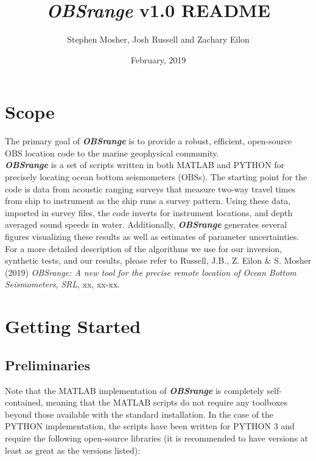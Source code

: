 \documentclass[titlepage, 12pt]{article}
\begin{document}
 \title{\textbf{\textit{\textit{\textbf{OBSrange}}}} v1.0 README}
 \author{Stephen Mosher, Josh Russell and Zachary Eilon}
 \date{February, 2019}
 \maketitle{}

 \tableofcontents
 \newpage

 \section{Scope}
   The primary goal of \textit{\textbf{OBSrange}} is to provide a robust, efficient, open-source OBS location code to the marine geophysical community.\\ 

   \textit{\textbf{OBSrange}} is a set of scripts written in both MATLAB and PYTHON for precisely locating ocean bottom seismometers (OBSs). The starting point for the code is data from acoustic ranging surveys that measure two-way travel times from ship to instrument as the ship runs a survey pattern. Using these data, imported in survey files, the code inverts for instrument locations, and depth averaged sound speeds in water. Additionally, \textit{\textbf{OBSrange}} generates several figures visualizing these results as well as estimates of parameter uncertainties. For a more detailed description of the algorithms we use for our inversion, synthetic tests, and our results, please refer to Russell, J.B., Z. Eilon \& S. Mosher (2019) \textit{OBSrange: A new tool for the precise remote location of Ocean Bottom Seismometers}, \textit{SRL}, xx, xx-xx.

 \section{Getting Started}
  
  \subsection{Preliminaries}
  Note that the MATLAB implementation of \textit{\textbf{OBSrange}} is completely self-contained, meaning that the MATLAB scripts do not require any toolboxes beyond those available with the standard installation. In the case of the PYTHON implementation, the scripts have been written for PYTHON 3 and require the following open-source libraries (it is recommended to have versions at least as great as the versions listed):
\end{document}
